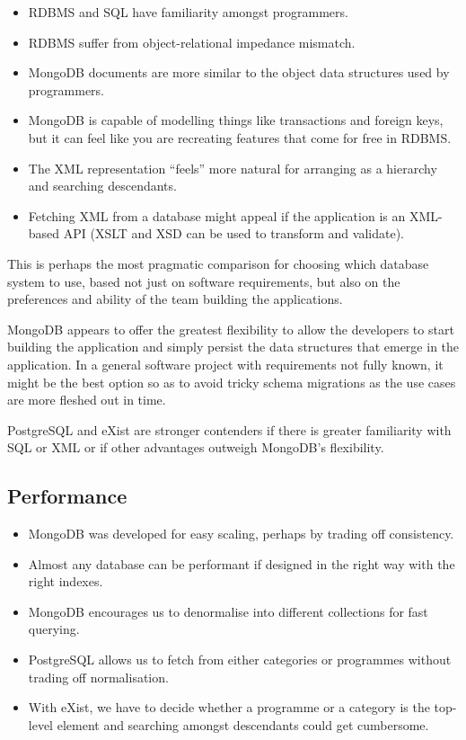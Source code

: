 \documentclass[11pt,a4paper]{article}
\begin{document}
\begin{itemize}
  \item RDBMS and SQL have familiarity amongst programmers.
  \item RDBMS suffer from object-relational impedance mismatch.
  \item MongoDB documents are more similar to the object data
    structures used by programmers.
  \item MongoDB is capable of modelling things like
    transactions and foreign keys, but it can
    feel like you are recreating features that come for free in RDBMS.
  \item The XML representation ``feels'' more natural for arranging
    as a hierarchy and searching descendants.
  \item Fetching XML from a database might appeal if the application
    is an XML-based API (XSLT and XSD can be used to transform
    and validate).
\end{itemize}

This is perhaps the most pragmatic comparison for choosing which
database system to use, based not just on software requirements, but
also on the preferences and ability of the team building the applications.

MongoDB appears to offer the greatest flexibility to allow the developers
to start building the application and simply persist
the data structures that emerge in the application. In
a general software project with requirements not fully known, it might
be the best option so as to avoid tricky schema migrations as
the use cases are more fleshed out in time.

PostgreSQL and eXist are stronger contenders if there is greater
familiarity with SQL or XML or if other advantages outweigh
MongoDB's flexibility.

\subsection{Performance}

\begin{itemize}
  \item MongoDB was developed for easy scaling, perhaps by
    trading off consistency.
  \item Almost any database can be performant if designed in the right
    way with the right indexes.
  \item MongoDB encourages us to denormalise into different collections
    for fast querying.
  \item PostgreSQL allows us to fetch from either categories or programmes
    without trading off normalisation.
  \item With eXist, we have to decide whether a programme or a category
    is the top-level element and searching amongst descendants could get
    cumbersome.
\end{itemize}
\end{document}

